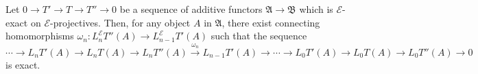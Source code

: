 Let $0 \to T' \to T \to T'' \to 0$ be a sequence of additive functors $\mathfrak{A} \to \mathfrak{B}$ which is $\mathcal{E}$-exact on $\mathcal{E}$-projectives. Then, for any object $A$ in $\mathfrak{A}$, there exist connecting homomorphisms $\omega_n : L_n^{\mathcal{E}} T''(A) \to L_{n-1}^{\mathcal{E}} T'(A)$ such that the sequence
$$\cdots \to L_n T'(A) \to L_n T(A) \to L_n T''(A) \xrightarrow{\omega_n} L_{n-1} T'(A) \to \cdots \to L_0 T'(A) \to L_0 T(A) \to L_0 T''(A) \to 0$$
is exact.